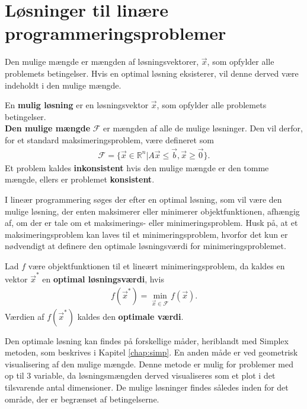 \section{Løsninger til linære programmeringsproblemer}

Den mulige mængde er mængden af løsningsvektorer, $\vec{x}$, som opfylder alle problemets betingelser. Hvis en optimal løsning eksisterer, vil denne derved være indeholdt i den mulige mængde.

\begin{defn}
En \textbf{mulig løsning} er en løsningsvektor $\vec{x}$, som opfylder alle problemets betingelser.\\
\textbf{Den mulige mængde} $\mathcal{F}$ er mængden af alle de mulige løsninger. Den vil derfor, for et standard maksimeringsproblem, være defineret som
\begin{align*}
\mathcal{F}=\{\vec{x} \in \mathds{R}^n|A\vec{x} \leq \vec{b}, \vec{x} \geq \vec{0}\}.
\end{align*}
Et problem kaldes \textbf{inkonsistent}  hvis den mulige mængde er den tomme mængde, ellers er problemet \textbf{konsistent}. 
\end{defn}

I lineær programmering søges der efter en optimal løsning, som vil være den mulige løsning, der enten maksimerer eller minimerer objektfunktionen, afhængig af, om der er tale om et maksimerings- eller minimeringsproblem. 
Husk på, at et maksimeringsproblem kan laves til et minimeringsproblem, hvorfor det kun er nødvendigt at definere den optimale løsningsværdi for minimeringsproblemet.
\begin{defn}
Lad $f$ være objektfunktionen til et lineært minimeringsproblem, da kaldes en vektor $\vec{x}^*$ en \textbf{optimal løsningsværdi}, hvis 
\begin{align}
	f(\vec{x}^*)=\min\limits_{\vec{x} \in \mathcal{F}}f(\vec{x}).
\end{align}
Værdien af $f(\vec{x}^*)$ kaldes den \textbf{optimale værdi}.
\end{defn}

Den optimale løsning kan findes på forskellige måder, heriblandt med Simplex metoden, som beskrives i Kapitel \ref{chap:simp}. En anden måde er ved geometrisk visualisering af den mulige mængde. Denne metode er mulig for problemer med op til 3 variable, da løsningsmængden derved visualiseres som et plot i det tilsvarende antal dimensioner. De mulige løsninger findes således inden for det område, der er begrænset af betingelserne. 

